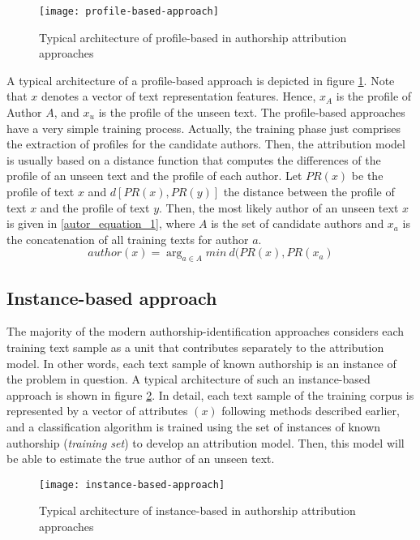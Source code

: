 \begin{figure}[ht]
	\centering
	\texttt{[image: profile-based-approach]}
	\caption[Profile-based approach]{Typical architecture of profile-based in authorship attribution approaches}
	\label{fig:profile_based_approach}
\end{figure}

A typical architecture of a profile-based approach is depicted in figure  \ref{fig:profile_based_approach}. Note that $x$ denotes a vector of text representation
features. Hence, $x_A$ is the profile of Author $A$, and $x_u$ is the
profile of the unseen text.
The profile-based approaches have a very simple training process. Actually, the training phase just comprises the extraction of profiles for the candidate authors. Then, the attribution model is usually based on a distance function that computes the differences of the profile of an unseen text and the profile of each author. Let $PR(x)$ be the profile of text $x$ and $d[PR(x),PR(y)]$ the distance between the profile of text $x$ and the profile of text $y$. Then, the most likely author of an unseen text $x$ is given in \ref{autor_equation_1}, where $A$ is the set of candidate authors and $x_a$ is the concatenation of all training texts for author $a$.
\begin{equation}\label{autor_equation_1}
author(x) = \arg_{a \in A} min\ d(PR(x), PR(x_a)
\end{equation}


\subsection{Instance-based approach}

The majority of the modern authorship-identification approaches considers each training text sample as a unit that contributes separately to the attribution model. In other words, each text sample of known authorship is an instance of the problem in question. A typical architecture of such an instance-based approach is shown in figure  \ref{fig:instance_based_approach}. In detail, each text sample of the training corpus is represented by a vector of attributes $(x)$ following methods described earlier, and a
classification algorithm is trained using the set of instances of known authorship (\textit{training set}) to develop an attribution model. Then, this model will be able to estimate the true author of an unseen text.

\begin{figure}[ht]
	\centering
	\texttt{[image: instance-based-approach]}
	\caption[Instance-based approach]{Typical architecture of instance-based in authorship attribution approaches}
	\label{fig:instance_based_approach}
\end{figure}

